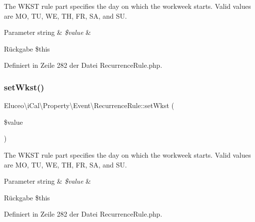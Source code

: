 The W\+K\+ST rule part specifies the day on which the workweek starts. Valid values are MO, TU, WE, TH, FR, SA, and SU.


\begin{DoxyParams}[1]{Parameter}
string & {\em \$value} & \\
\hline
\end{DoxyParams}
\begin{DoxyReturn}{Rückgabe}
\$this 
\end{DoxyReturn}


Definiert in Zeile 282 der Datei Recurrence\+Rule.\+php.

\mbox{\label{class_eluceo_1_1i_cal_1_1_property_1_1_event_1_1_recurrence_rule_a135a880639390f1f0f7f7c82deef1fd7}} 
\subsubsection{\texorpdfstring{set\+Wkst()}{setWkst()}\hspace{0.1cm}{\footnotesize\ttfamily [2/3]}}
{\footnotesize\ttfamily Eluceo\textbackslash{}i\+Cal\textbackslash{}\+Property\textbackslash{}\+Event\textbackslash{}\+Recurrence\+Rule\+::set\+Wkst (\begin{DoxyParamCaption}\item[{}]{\$value }\end{DoxyParamCaption})}

The W\+K\+ST rule part specifies the day on which the workweek starts. Valid values are MO, TU, WE, TH, FR, SA, and SU.


\begin{DoxyParams}[1]{Parameter}
string & {\em \$value} & \\
\hline
\end{DoxyParams}
\begin{DoxyReturn}{Rückgabe}
\$this 
\end{DoxyReturn}


Definiert in Zeile 282 der Datei Recurrence\+Rule.\+php.

\mbox{\label{class_eluceo_1_1i_cal_1_1_property_1_1_event_1_1_recurrence_rule_a135a880639390f1f0f7f7c82deef1fd7}} 
